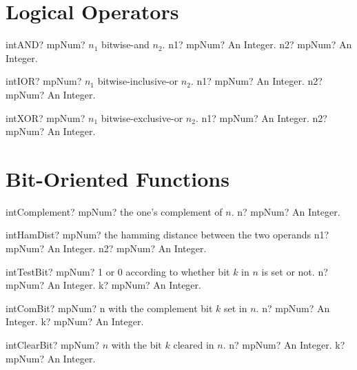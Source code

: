 \documentclass[12pt,a4paper,openany]{book}
\begin{document}
\section{Logical Operators }

\begin{mpFunctionsExtract}
\mpFunctionTwo
{intAND? mpNum? $n_1$ bitwise-and $n_2$.}
{n1? mpNum? An Integer.}
{n2? mpNum? An Integer.}
\end{mpFunctionsExtract}

\begin{mpFunctionsExtract}
\mpFunctionTwo
{intIOR? mpNum? $n_1$ bitwise-inclusive-or $n_2$.}
{n1? mpNum? An Integer.}
{n2? mpNum? An Integer.}
\end{mpFunctionsExtract}

\begin{mpFunctionsExtract}
\mpFunctionTwo
{intXOR? mpNum? $n_1$ bitwise-exclusive-or $n_2$.}
{n1? mpNum? An Integer.}
{n2? mpNum? An Integer.}
\end{mpFunctionsExtract}

\section{Bit-Oriented Functions}

\begin{mpFunctionsExtract}
\mpFunctionOne
{intComplement? mpNum? the one's complement of $n$.}
{n? mpNum? An Integer.}
\end{mpFunctionsExtract}

\begin{mpFunctionsExtract}
\mpFunctionTwo
{intHamDist? mpNum? the hamming distance between the two operands}
{n1? mpNum? An Integer.}
{n2? mpNum? An Integer.}
\end{mpFunctionsExtract}

\begin{mpFunctionsExtract}
\mpFunctionTwo
{intTestBit? mpNum? 1 or 0 according to whether bit $k$ in $n$ is set or not.}
{n? mpNum? An Integer.}
{k? mpNum? An Integer.}
\end{mpFunctionsExtract}

\begin{mpFunctionsExtract}
\mpFunctionTwo
{intComBit? mpNum? n with the complement bit $k$ set in $n$.}
{n? mpNum? An Integer.}
{k? mpNum? An Integer.}
\end{mpFunctionsExtract}

\begin{mpFunctionsExtract}
\mpFunctionTwo
{intClearBit? mpNum? $n$ with the bit $k$ cleared in $n$.}
{n? mpNum? An Integer.}
{k? mpNum? An Integer.}
\end{mpFunctionsExtract}
\end{document}
